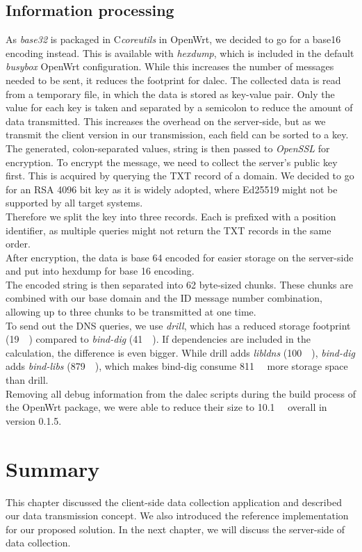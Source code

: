 \subsection{Information processing}
    As \textit{base32} is packaged in C\textit{coreutils} in OpenWrt, we decided to go for a base16 encoding instead. This is available with \textit{hexdump}, which is included in the default \textit{busybox} OpenWrt configuration. While this increases the number of messages needed to be sent, it reduces the footprint for dalec. The collected data is read from a temporary file, in which the data is stored as key-value pair. Only the value for each key is taken and separated by a semicolon to reduce the amount of data transmitted. This increases the overhead on the server-side, but as we transmit the client version in our transmission, each field can be sorted to a key.\\
    The generated, colon-separated values, string is then passed to \textit{OpenSSL} for encryption. To encrypt the message, we need to collect the server's public key first.
    This is acquired by querying the TXT record of a domain. We decided to go for an RSA 4096 bit key as it is widely adopted, where Ed25519 might not be supported by all target systems.\\
    Therefore we split the key into three records. Each is prefixed with a position identifier, as multiple queries might not return the TXT records in the same order.\\
    After encryption, the data is base 64 encoded for easier storage on the server-side and put into hexdump for base 16 encoding.\\
    The encoded string is then separated into 62 byte-sized chunks. These chunks are combined with our base domain and the ID message number combination, allowing up to three chunks to be transmitted at one time.\\
    To send out the DNS queries, we use \textit{drill}, which has a reduced storage footprint (\SIlist{19}{\kilo\byte}) compared to \textit{bind-dig} (\SIlist{41}{\kilo\byte}). If dependencies are included in the calculation, the difference is even bigger. While drill adds \textit{libldns} (\SIlist{100}{\kilo\byte}), \textit{bind-dig}
    adds \textit{bind-libs} (\SIlist{879}{\kilo\byte}), which makes bind-dig consume \SIlist{811}{\kilo\byte} more storage space than drill.\\
    Removing all debug information from the dalec scripts during the build process of the OpenWrt package, we were able to reduce their size to \SIlist{10.1}{\kilo\byte} overall in version 0.1.5.
    
\section{Summary}

This chapter discussed the client-side data collection application and described our data transmission concept. We also introduced the reference implementation for our proposed solution. In the next chapter, we will discuss the server-side of data collection.
%